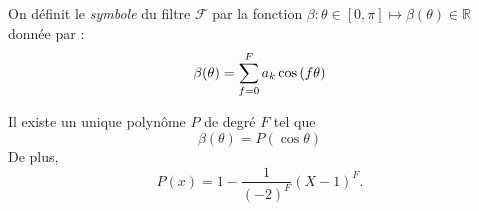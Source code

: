 On définit le \textit{symbole} du filtre $\mathcal{F}$ par la fonction $\beta : \theta \in [0, \pi] \mapsto \beta(\theta) \in \mathbb{R}$ donnée par :
\begin{equation}
\beta( \theta ) = \displaystyle\sum\limits_{f=0}^F a_k \cos \left( f \theta \right)
\end{equation}

\begin{proposition}
Il existe un unique polynôme $P$ de degré $F$ tel que 
\begin{equation}
\beta(\theta) = P(\cos \theta )
\end{equation}
De plus,
\begin{equation}
P(x) = 1 -\dfrac{1}{(-2)^F} (X - 1)^F.
\end{equation}
\end{proposition}

